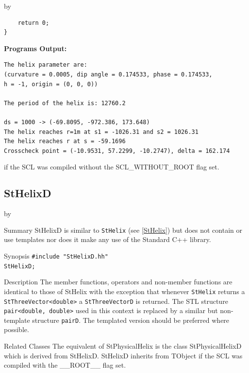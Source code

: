 \documentclass[twoside]{article}
\newcommand{\name}[1]{\textsf{#1}}%
\newcommand{\entrylabel}[1]{\mbox{\textbf{{#1}}}\hfil}%
\newenvironment{entry}
{\begin{list}{}%
    {\renewcommand{\makelabel}{\entrylabel}%
     \setlength{\labelwidth}{90pt}%
     \setlength{\leftmargin}{\labelwidth}
     \advance\leftmargin by \labelsep%
      }%
    }%
  {\end{list}}
\newcommand{\Entrylabel}[1]%
{\raisebox{0pt}[1ex][0pt]{\makebox[\labelwidth][l]%
    {\parbox[t]{\labelwidth}{\hspace{0pt}\textbf{{#1}}}}}}
\newenvironment{Entry}%
{\renewcommand{\entrylabel}{\Entrylabel}\begin{entry}}%
  {\end{entry}}
\begin{document}
\begin{description}
\begin{Entry}
{\begin{verbatim}
    return 0;
}
\end{verbatim}
}%
{\bf Programs Output:}
{\footnotesize
\begin{verbatim}
The helix parameter are:
(curvature = 0.0005, dip angle = 0.174533, phase = 0.174533,
h = -1, origin = (0, 0, 0))

The period of the helix is: 12760.2

ds = 1000 -> (-69.8095, -972.386, 173.648)
The helix reaches r=1m at s1 = -1026.31 and s2 = 1026.31
The helix reaches r at s = -59.1696
Crosscheck point = (-10.9531, 57.2299, -10.2747), delta = 162.174

\end{verbatim}
} %
\end{Entry}

\clearpage
    if the SCL was compiled without the \name{SCL\_WITHOUT\_ROOT} flag set.
%
%
\subsection{StHelixD } \label{StHelixD}
\begin{Entry}
\item[Summary]
    StHelixD is similar to \texttt{StHelix}
    (see \ref{StHelix}) but does not contain or use templates nor
    does it make any use of the Standard C++ library. 
    
\item[Synopsis]
    \verb+#include "StHelixD.hh"+ \\
    \verb+StHelixD;+
    
    
\item[Description]       
    The member functions, operators and non-member functions are identical
    to those of StHelix with the exception that whenever \texttt{StHelix} returns a
    \verb+StThreeVector<double>+ a \texttt{StThreeVectorD} is returned.
    The STL structure \verb+pair<double, double>+ used in this context is replaced
    by a similar but non-template structure \texttt{pairD}. 
    The templated version should be preferred where possible.

\item[Related Classes]
    The equivalent of StPhysicalHelix is the class StPhysicalHelixD which is
    derived from StHelixD. StHelixD inherits from TObject 
    if the SCL was compiled with the \name{\_\_ROOT\_\_} flag set.


\end{Entry}
\end{description}
\end{document}
